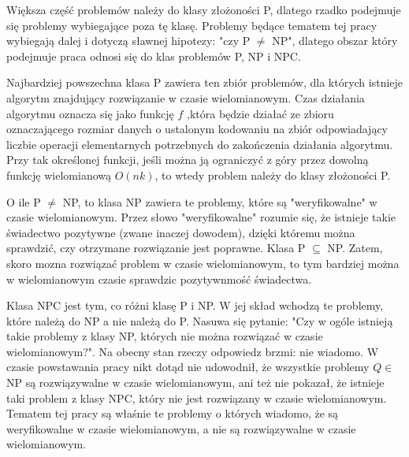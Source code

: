 Większa część problemów należy do klasy złożoności P, dlatego rzadko podejmuje się problemy wybiegające poza tę klasę. Problemy będące tematem tej pracy wybiegają dalej i dotyczą sławnej hipotezy: "czy P $\ne$ NP", dlatego obszar który podejmuje praca odnosi się do klas problemów P, NP i NPC.

Najbardziej powszechna klasa P zawiera ten zbiór problemów, dla których istnieje algorytm znajdujący rozwiązanie w czasie wielomianowym. Czas działania algorytmu oznacza się jako funkcję $f$ ,która będzie działać ze zbioru oznaczającego rozmiar danych o ustalonym kodowaniu na zbiór odpowiadający liczbie operacji elementarnych potrzebnych do zakończenia działania algorytmu. Przy tak określonej funkcji, jeśli można ją ograniczyć z góry przez dowolną funkcję wielomianową $O(nk)$, to wtedy problem należy do klasy złożoności P.

O ile P $\ne$ NP, to klasa NP zawiera te problemy, które są "weryfikowalne" w czasie wielomianowym. Przez słowo "weryfikowalne" rozumie się, że istnieje takie świadectwo pozytywne (zwane inaczej dowodem), dzięki któremu można sprawdzić, czy otrzymane rozwiązanie jest poprawne.
Klasa P $\subseteq$ NP. Zatem, skoro mozna rozwiązać problem w czasie wielomianowym, to tym bardziej można w wielomianowym czasie sprawdzic pozytywnmość świadectwa.

Klasa NPC jest tym, co różni klasę P i NP. W jej skład wchodzą te problemy, które należą do NP a nie należą do P. Nasuwa się pytanie: "Czy w ogóle istnieją takie problemy z klasy NP, których nie można rozwiązać w czasie wielomianowym?". Na obecny stan rzeczy odpowiedz brzmi: nie wiadomo. W czasie powstawania pracy nikt dotąd nie udowodnił, że wszystkie problemy $Q\in$ NP są rozwiązywalne w czasie wielomianowym, ani też nie pokazał, że istnieje taki problem z klasy NPC, który nie jest rozwiązany w czasie wielomianowym. Tematem tej pracy są właśnie te problemy o których wiadomo, że są weryfikowalne w czasie wielomianowym, a nie są rozwiązywalne w czasie wielomianowym.



